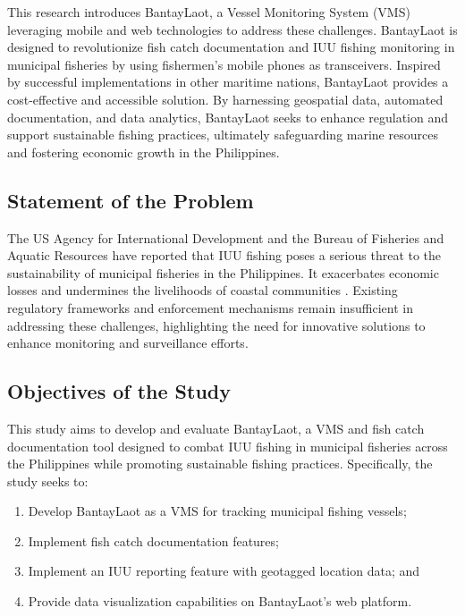 \documentclass{icsthesis}
\begin{document}
\begin{mainmatter}
            This research introduces BantayLaot, a Vessel Monitoring System (VMS) leveraging mobile and web technologies to address these challenges. BantayLaot is designed to revolutionize fish catch documentation and IUU fishing monitoring in municipal fisheries by using fishermen's mobile phones as transceivers. Inspired by successful implementations in other maritime nations, BantayLaot provides a cost-effective and accessible solution. By harnessing geospatial data, automated documentation, and data analytics, BantayLaot seeks to enhance regulation and support sustainable fishing practices, ultimately safeguarding marine resources and fostering economic growth in the Philippines.
            
            \subsection{Statement of the Problem}
            The US Agency for International Development and the Bureau of Fisheries and Aquatic Resources have reported that IUU fishing poses a serious threat to the sustainability of municipal fisheries in the Philippines. It exacerbates economic losses and undermines the livelihoods of coastal communities \citep{Coastal2021}. Existing regulatory frameworks and enforcement mechanisms remain insufficient in addressing these challenges, highlighting the need for innovative solutions to enhance monitoring and surveillance efforts.

            \subsection{Objectives of the Study}
            This study aims to develop and evaluate BantayLaot, a VMS and fish catch documentation tool designed to combat IUU fishing in municipal fisheries across the Philippines while promoting sustainable fishing practices. Specifically, the study seeks to:
            \begin{enumerate}
                \item Develop BantayLaot as a VMS for tracking municipal fishing vessels;
                \item Implement fish catch documentation features;
                \item Implement an IUU reporting feature with geotagged location data; and
                \item Provide data visualization capabilities on BantayLaot's web platform.
            \end{enumerate}

\end{mainmatter}
\end{document}
